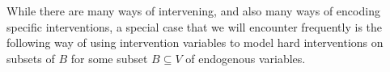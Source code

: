 While there are many ways of intervening, and also many ways of encoding specific interventions, a special case that we will encounter frequently is the following way of using intervention variables to model hard interventions on subsets of $B$ for some subset $B \subseteq V$ of endogenous variables.

